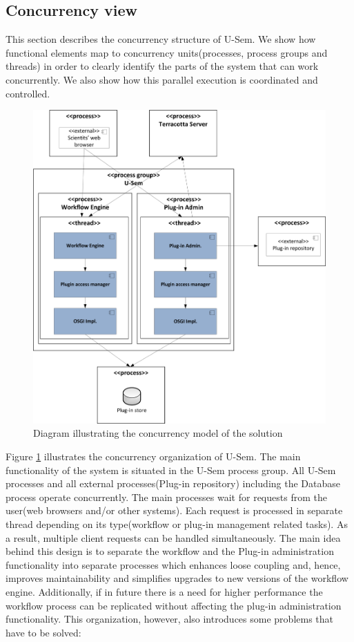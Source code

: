 \subsection{Concurrency view}
\label{sec:pluginConcur}

This section describes the concurrency structure of U-Sem. We show how functional elements map to concurrency units(processes, process groups and threads) in order to clearly identify the parts of the system that can work concurrently. We also show how this parallel execution is coordinated and controlled.

\begin{figure}[h!]
  \centering
  	\includegraphics[scale=0.70]{plug-in/layers/concur.png}
  \caption{Diagram illustrating the concurrency model of the solution}
  \label{fig_conc}
\end{figure}

Figure \ref{fig_conc} illustrates the concurrency organization of U-Sem. The main functionality of the system is situated in the U-Sem process group. All U-Sem processes and all external processes(Plug-in repository) including the Database process operate concurrently. The main processes wait for requests from the user(web browsers and/or other systems). Each request is processed in separate thread depending on its type(workflow or plug-in management related tasks). As a result, multiple client requests can be handled simultaneously. The main idea behind this design is to separate the workflow and the Plug-in administration functionality into separate processes which enhances loose coupling and, hence, improves maintainability and simplifies upgrades to new versions of the workflow engine. Additionally, if in future there is a need for higher performance the workflow process can be replicated without affecting the plug-in administration functionality. This organization, however, also introduces some problems that have to be solved:

